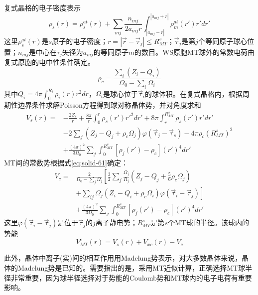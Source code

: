 复式晶格的电子密度表示
\begin{equation}
  \rho_s(r)=\rho_s^{at}(r)+\sum_{mj}\dfrac{n_{mj}}{2a_{mj}r}\int_{|a_{mj}-r|}^{|a_{mj}+r|}\rho_m^{at}(r')r'dr'
  \label{eq:equation-58}
\end{equation}
这里$\rho_s^{at}(r)$是$s$原子的电子密度；$r=|\vec r-\vec{\tau}_j|\leqslant R_{MT}^s$；$\vec{\tau}_j$是第$j$个等同原子球心位置；$n_{mj}$是中心在$\tau_j$矢径为$a_{mj}$的等同原子$m$的数目。WS原胞MT球外的常数电荷由复式原胞的电中性条件确定。
\begin{equation}
  \rho_c=\dfrac{\sum_i(Z_i-Q_i)}{\Omega_0-\sum_i\Omega_i}
  \label{eq:solid-59}
\end{equation}
其中$Q_i=4\pi\int_0^{R_i}\rho_i(r)r^2dr$，$\Omega_i$是球心位于$\vec{\tau}_i$的球体积。在复式晶格内，根据周期性边界条件求解Poisson方程得到球对称晶体势，并对角度求和
\begin{equation}
  \begin{split}
   V_s(r)=&-\frac{2Z_s}r+\frac{8\pi}r\int_0^r\rho_s(r')r'^2dr'+8\pi\int_r^{R_{MT}^s}\rho_s(r')r'dr' \\
   &-2\sum_j(Z_j-Q_j+\rho_c\Omega_j)\varphi(\vec{\tau}_j-\vec{\tau}_s)-4\pi\rho_c(R_{MT}^s)^2 \\
   &+\frac{(4\pi)^2}{3\Omega_0}\sum_j\int_0^{R_{MT}^s}[\rho_j(r')-\rho_c](r')^4dr'
  \end{split}
  \label{eq:solid-60}
\end{equation}
MT间的常数势根据式\eqref{eq:solid-61}确定：
\begin{equation}
  \begin{split}
    V_c=&\frac2{\Omega_0-\sum_j\Omega_j}\left[\frac32\sum_j\frac{\Omega_j}{R_j}\left(Z_j-Q_j+\frac56\rho_c\Omega_j\right)\right.\\
    &+\left.\sum_{ij}\Omega_j(Z_i-Q_i+\rho_c\Omega_i)\varphi(\vec{\tau}_i-\vec{\tau}_j)\right] \\
    &+\frac{(4\pi)^2}{3\Omega_0}\sum_j\int_0^{R_{MT}^s}[\rho_j(r')-\rho_c](r')^4dr'
  \end{split}
  \label{eq:solid-61}
\end{equation}
这里$\varphi(\vec{\tau}_i-\vec{\tau}_j)$是位于$\vec{\tau}_j$的$j$离子静电势；$R_{MT}^s$是第$s$个MT球的半径。该球内的势能
\begin{equation}
  V_{MT}^s(r)=V_s(r)+V_{xc}(r)-V_c
  \label{eq:solid-62}
\end{equation}

此外，晶体中离子(实)间的相互作用用Madelung势表示，对大多数晶体来说，晶体的Madelung势是已知的。需要指出的是，采用MT近似计算，正确选择MT球半径非常重要，因为球半径选择对于势能的Coulomb势和MT球内的电子电荷有重要影响。%

